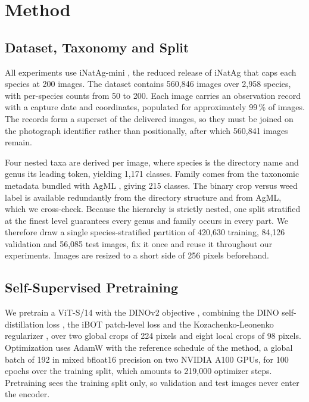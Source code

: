 \documentclass[english]{lni}
\begin{document}
\section{Method}\label{sec:method}

\subsection{Dataset, Taxonomy and Split}\label{sec:data}

All experiments use iNatAg-mini \cite{Jain2025}, the reduced release of iNatAg that caps each species at 200 images. The dataset contains 560,846 images over 2,958 species, with per-species counts from 50 to 200. Each image carries an observation record with a capture date and coordinates, populated for approximately 99\,\% of images. The records form a superset of the delivered images, so they must be joined on the photograph identifier rather than positionally, after which 560,841 images remain.

Four nested taxa are derived per image, where species is the directory name and genus its leading token, yielding 1,171 classes. Family comes from the taxonomic metadata bundled with AgML \cite{Joshi2023}, giving 215 classes. The binary crop versus weed label is available redundantly from the directory structure and from AgML, which we cross-check. Because the hierarchy is strictly nested, one split stratified at the finest level guarantees every genus and family occurs in every part. We therefore draw a single species-stratified partition of 420,630 training, 84,126 validation and 56,085 test images, fix it once and reuse it throughout our experiments. Images are resized to a short side of 256 pixels beforehand.

\subsection{Self-Supervised Pretraining}\label{sec:pretrain}

We pretrain a ViT-S/14 \cite{Dosovitskiy2021} with the DINOv2 objective \cite{Oquab2024}, combining the DINO self-distillation loss \cite{Caron2021}, the iBOT patch-level loss \cite{Zhou2022} and the Kozachenko-Leonenko regularizer \cite{Sablayrolles2019}, over two global crops of 224 pixels and eight local crops of 98 pixels. Optimization uses AdamW with the reference schedule of the method, a global batch of 192 in mixed bfloat16 precision on two NVIDIA A100 GPUs, for 100 epochs over the training split, which amounts to 219,000 optimizer steps. Pretraining sees the training split only, so validation and test images never enter the encoder.
\end{document}
